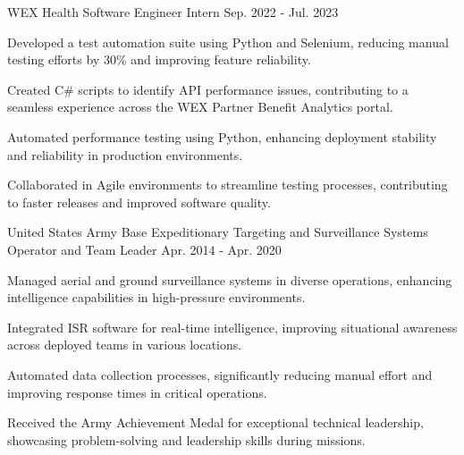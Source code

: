 \begin{cventries}
        \cventry
          {WEX Health} %
          {Software Engineer Intern} %
          {} %
          {Sep. 2022 - Jul. 2023} %
          {
            \begin{cvitems} %
            \item {Developed a test automation suite using Python and Selenium, reducing manual testing efforts by 30\% and improving feature reliability.}
    \item {Created C\# scripts to identify API performance issues, contributing to a seamless experience across the WEX Partner Benefit Analytics portal.}
    \item {Automated performance testing using Python, enhancing deployment stability and reliability in production environments.}
    \item {Collaborated in Agile environments to streamline testing processes, contributing to faster releases and improved software quality.}
            \end{cvitems}
          }

        \cventry
          {United States Army} %
          {Base Expeditionary Targeting and Surveillance Systems Operator and Team Leader} %
          {} %
          {Apr. 2014 - Apr. 2020} %
          {
            \begin{cvitems} %
            \item {Managed aerial and ground surveillance systems in diverse operations, enhancing intelligence capabilities in high-pressure environments.}
    \item {Integrated ISR software for real-time intelligence, improving situational awareness across deployed teams in various locations.}
    \item {Automated data collection processes, significantly reducing manual effort and improving response times in critical operations.}
    \item {Received the Army Achievement Medal for exceptional technical leadership, showcasing problem-solving and leadership skills during missions.}
            \end{cvitems}
          }
\end{cventries}
